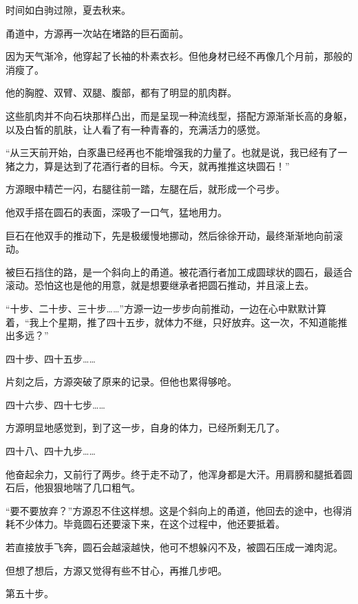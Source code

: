 
\begin{this_body}



时间如白驹过隙，夏去秋来。

甬道中，方源再一次站在堵路的巨石面前。

因为天气渐冷，他穿起了长袖的朴素衣衫。但他身材已经不再像几个月前，那般的消瘦了。

他的胸膛、双臂、双腿、腹部，都有了明显的肌肉群。

这些肌肉并不向石块那样凸出，而是呈现一种流线型，搭配方源渐渐长高的身躯，以及白皙的肌肤，让人看了有一种青春的，充满活力的感觉。

“从三天前开始，白豕蛊已经再也不能增强我的力量了。也就是说，我已经有了一猪之力，算是达到了花酒行者的目标。今天，就再推推这块圆石！”

方源眼中精芒一闪，右腿往前一踏，左腿在后，就形成一个弓步。

他双手搭在圆石的表面，深吸了一口气，猛地用力。

巨石在他双手的推动下，先是极缓慢地挪动，然后徐徐开动，最终渐渐地向前滚动。

被巨石挡住的路，是一个斜向上的甬道。被花酒行者加工成圆球状的圆石，最适合滚动。恐怕这也是他的用意，就是想要继承者把圆石推动，并且滚上去。

“十步、二十步、三十步……”方源一边一步步向前推动，一边在心中默默计算着，“我上个星期，推了四十五步，就体力不继，只好放弃。这一次，不知道能推出多远？”

四十步、四十五步……

片刻之后，方源突破了原来的记录。但他也累得够呛。

四十六步、四十七步……

方源明显地感觉到，到了这一步，自身的体力，已经所剩无几了。

四十八、四十九步……

他奋起余力，又前行了两步。终于走不动了，他浑身都是大汗。用肩膀和腿抵着圆石后，他狠狠地喘了几口粗气。

“要不要放弃？”方源忍不住这样想。这是个斜向上的甬道，他回去的途中，也得消耗不少体力。毕竟圆石还要滚下来，在这个过程中，他还要抵着。

若直接放手飞奔，圆石会越滚越快，他可不想躲闪不及，被圆石压成一滩肉泥。

但想了想后，方源又觉得有些不甘心，再推几步吧。

第五十步。


\end{this_body}
